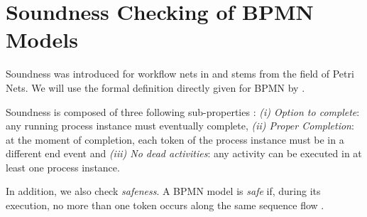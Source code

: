\documentclass[runningheads]{llncs}
\begin{document}

\cite{corradiniClassificationBPMNCollaborations2018}


\section{Soundness Checking of BPMN Models}

Soundness was introduced for workflow nets in \cite{vanderaalstAPPLICATIONPETRINETS1998} and stems from the field of Petri Nets.
We will use the formal definition directly given for BPMN by \cite{corradiniClassificationBPMNCollaborations2018}.

Soundness is composed of three following sub-properties \cite{corradiniClassificationBPMNCollaborations2018}:
\textit{(i) Option to complete}: any running process instance must eventually complete,
\textit{(ii) Proper Completion}: at the moment of completion, each token of the process instance must be in a different end event and
\textit{(iii) No dead activities}: any activity can be executed in at least one process instance.

In addition, we also check \textit{safeness}.
A BPMN model is \textit{safe} if, during its execution, no more than one token occurs along the same sequence flow \cite{corradiniClassificationBPMNCollaborations2018}.
\end{document}
